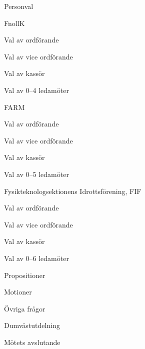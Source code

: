 \documentclass[prelim]{sektionsmote}
\begin{document}
\begin{ootd}
\item{Personval}
\begin{ootd}
  \item FnollK
  \begin{ootd}
    \item Val av ordförande
    \item Val av vice ordförande
    \item Val av kassör
    \item Val av 0--4 ledamöter
  \end{ootd}
  \item FARM
  \begin{ootd}
    \item Val av ordförande
    \item Val av vice ordförande
    \item Val av kassör
    \item Val av 0--5 ledamöter
  \end{ootd}
  \item Fysikteknologsektionens Idrottsförening, FIF
  \begin{ootd}
    \item Val av ordförande
    \item Val av vice ordförande
    \item Val av kassör
    \item Val av 0--6 ledamöter
  \end{ootd}
\end{ootd}

\item{Propositioner}

\item{Motioner}

\item{Övriga frågor}

\item{Dumvästutdelning}

\item{Mötets avslutande}
\end{ootd}

\begin{bilagor}
    
    

\end{bilagor}
\end{document}
